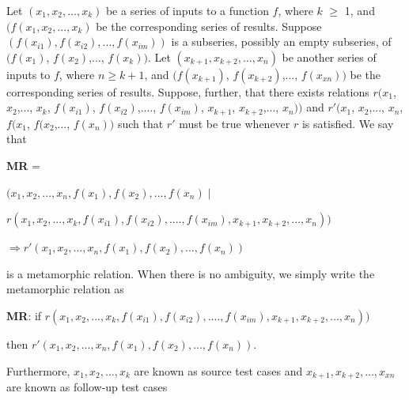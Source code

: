 \begin{mydef}

Let $(x_{1}, x_{2},..., x_{k})$ be a series of inputs to a function $f$, where $k$ $\geqslant$ 1, and $(f(x_{1}, x_{2},..., x_{k})$ be the corresponding series of results. Suppose $(f(x_{i1}), f(x_{i2}),..., f(x_{im}))$ is a subseries, possibly an empty subseries, of $(f(x_{1})$, $f(x_{2})$,..., $f(x_{k}))$. Let $(x_{k+1}, x_{k+2},..., x_{n})$ be another series of inputs to $f$, where $n \geqslant k+1$, and $(f(x_{k+1})$, $f(x_{k+2})$,..., $f(x_{xn}))$ be the corresponding series of results. Suppose, further, that there exists relations $r(x_{1}$, $x_{2}$,..., $x_{k}$, $f(x_{i1})$, $f(x_{i2})$,...., $f(x_{im})$, $x_{k+1}$, $x_{k+2}$,..., $x_{n}))$ and $r'$$(x_{1}$, $x_{2}$,..., $x_{n}$, $f(x_{1}$, $f(x_{2}$,..., $f(x_{n}))$ such that $r'$ must be true whenever $r$ is satisfied. We say that 


\textbf{MR} = {$(x_{1}, x_{2},...,x_{n}, f(x_{1}), f(x_{2}),..., f(x_{n}) \mid$

$r(x_{1}, x_{2},..., x_{k}, f(x_{i1}), f(x_{i2}),...., f(x_{im}), x_{k+1}, x_{k+2},..., x_{n}))$

$\Rightarrow r'(x_{1}, x_{2},..., x_{n}, f(x_{1}), f(x_{2}),..., f(x_{n}))$} 

is a metamorphic relation. When there is no ambiguity, we simply write the metamorphic relation as 	

\textbf{MR}: if $r(x_{1}, x_{2},..., x_{k}, f(x_{i1}), f(x_{i2}),...., f(x_{im}), x_{k+1}, x_{k+2},..., x_{n}))$

then $r'(x_{1}, x_{2},..., x_{n}, f(x_{1}), f(x_{2}),..., f(x_{n})).$

Furthermore, $x_{1}, x_{2},..., x_{k}$ are known as source test cases and $x_{k+1}, x_{k+2},..., x_{xn}$ are known as follow-up test cases

\end{mydef}

